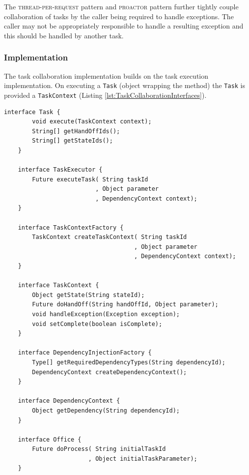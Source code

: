 \documentclass[prodmode]{style/acmlarge}
\begin{document}
The \textsc{thread-per-request} pattern and \textsc{proactor} pattern further
tightly couple collaboration of tasks by the caller being required to handle
exceptions.  The caller may not be appropriately responsible to handle a
resulting exception and this should be handled by another task.


\subsubsection*{Implementation}

The task collaboration implementation builds on the task execution
implementation.  On executing a \texttt{Task} (object wrapping the method) the
\texttt{Task} is provided a \texttt{TaskContext} (Listing
\ref{lst:TaskCollaborationInterfaces}).

\lstset{caption=Task collaboration pattern interfaces.}
\begin{lstlisting}[float,label=lst:TaskCollaborationInterfaces]
    interface Task {
        void execute(TaskContext context);
        String[] getHandOffIds();
        String[] getStateIds();
    }

    interface TaskExecutor {
        Future executeTask( String taskId 
                          , Object parameter
                          , DependencyContext context);
    }

    interface TaskContextFactory {
        TaskContext createTaskContext( String taskId
                                     , Object parameter
                                     , DependencyContext context);
    }

    interface TaskContext {
        Object getState(String stateId);
        Future doHandOff(String handOffId, Object parameter);
        void handleException(Exception exception);
        void setComplete(boolean isComplete);
    }

    interface DependencyInjectionFactory {
        Type[] getRequiredDependencyTypes(String dependencyId);
        DependencyContext createDependencyContext();
    }
    
    interface DependencyContext {
        Object getDependency(String dependencyId);
    }

    interface Office {
        Future doProcess( String initialTaskId
                        , Object initialTaskParameter);
    }
\end{lstlisting}
\end{document}
